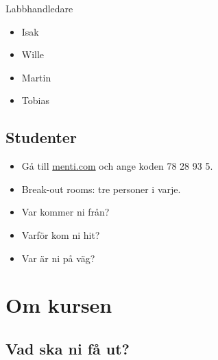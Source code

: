 \begin{frame}
  \begin{block}{Labbhandledare}
    \begin{itemize}
      \item Isak
      \item Wille
      \item Martin
      \item Tobias
    \end{itemize}
  \end{block}
\end{frame}

\subsection{Studenter}

\begin{frame}
  \begin{exercise}
    \begin{itemize}
      \item Gå till \url{menti.com} och ange koden 78 28 93 5.
    \end{itemize}
  \end{exercise}
\end{frame}

\begin{frame}
  \begin{exercise}[Vilka är ni?]
    \begin{itemize}
      \item Break-out rooms: tre personer i varje.
      \item Var kommer ni från?
      \item Varför kom ni hit?
      \item Var är ni på väg?
    \end{itemize}
  \end{exercise}
\end{frame}


\section{Om kursen}

\subsection{Vad ska ni få ut?}

